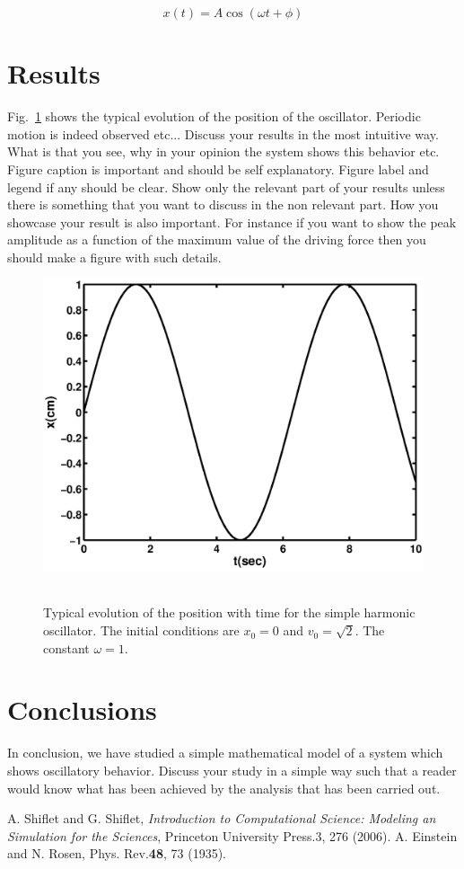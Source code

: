 \documentclass[aps,twocolumn,10pt,reprint]{revtex4}
\newcommand{\be}{\begin{equation}}
\newcommand{\ee}{\end{equation}}
\begin{document}
\be\label{Eq:SHMSol}
x(t) = A \cos\left(\omega t + \phi\right)
\ee


\section{Results}

Fig.~\ref{Fig:shm} shows the typical evolution of the position of the oscillator. Periodic motion is indeed observed etc... Discuss your results in the most intuitive way. What is that you see, why in your opinion the system shows this behavior etc. Figure caption is important and should be self explanatory. Figure label and legend if any should be clear. Show only the relevant part of your results unless there is something that you want to discuss in the non relevant part. How you showcase your result is also important. For instance if you want to show the peak amplitude as a function of the maximum value of the driving force then you should make a figure with such details.
\begin{figure}[!h]
\centering
\includegraphics[width = 3.50 in]{shm}~
\caption{Typical evolution of the position with time for the simple harmonic oscillator. The initial conditions are $x_{0} = 0$ and $v_{0} = \sqrt{2}$. The constant $\omega =1$.}\label{Fig:shm}
\end{figure}
\section{Conclusions}
In conclusion, we have studied a simple mathematical model of a system which shows oscillatory behavior. Discuss your study in a simple way such that a reader would know what has been achieved by the analysis that has been carried out. 

\begin{thebibliography}{}
 A. Shiflet and G. Shiflet, {\it Introduction to Computational Science: Modeling an Simulation for the Sciences}, Princeton University Press.3, 276 (2006).
 A. Einstein and N. Rosen, Phys. Rev.{\bf 48}, 73 (1935).
\end{thebibliography}
\end{document}

